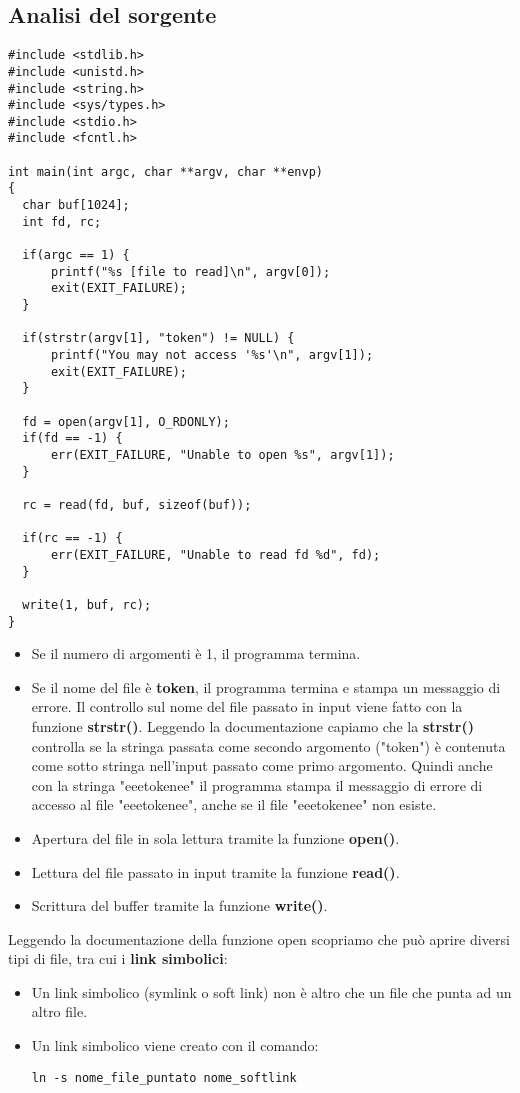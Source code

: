 \subsection{Analisi del sorgente}
\begin{lstlisting}[style=cstyle]
#include <stdlib.h>
#include <unistd.h>
#include <string.h>
#include <sys/types.h>
#include <stdio.h>
#include <fcntl.h>

int main(int argc, char **argv, char **envp)
{
  char buf[1024];
  int fd, rc;

  if(argc == 1) {
      printf("%s [file to read]\n", argv[0]);
      exit(EXIT_FAILURE);
  }

  if(strstr(argv[1], "token") != NULL) {
      printf("You may not access '%s'\n", argv[1]);
      exit(EXIT_FAILURE);
  }

  fd = open(argv[1], O_RDONLY);
  if(fd == -1) {
      err(EXIT_FAILURE, "Unable to open %s", argv[1]);
  }

  rc = read(fd, buf, sizeof(buf));
  
  if(rc == -1) {
      err(EXIT_FAILURE, "Unable to read fd %d", fd);
  }

  write(1, buf, rc);
}
\end{lstlisting}
\begin{itemize}
    \item Se il numero di argomenti è 1, il programma termina.
    \item Se il nome del file è \textbf{token}, il programma termina e stampa un messaggio di errore.
    Il controllo sul nome del file passato in input viene fatto con la funzione \textbf{strstr()}. Leggendo la documentazione capiamo che la \textbf{strstr()} controlla se la stringa passata come secondo argomento ("token") è contenuta come sotto stringa nell’input passato come primo argomento. Quindi anche con la stringa "eeetokenee" il programma stampa il messaggio di errore di accesso al file "eeetokenee", anche se il file "eeetokenee" non esiste.
    \item Apertura del file in sola lettura tramite la funzione \textbf{open()}.
    \item Lettura del file passato in input tramite la funzione \textbf{read()}.
    \item Scrittura del buffer tramite la funzione \textbf{write()}.
\end{itemize}
Leggendo la documentazione della funzione open scopriamo che può aprire diversi tipi di file, tra cui i \textbf{link simbolici}:
\begin{itemize}
    \item Un link simbolico (symlink o soft link) non è altro che un file che punta ad un altro file.
    \item Un link simbolico viene creato con il comando:
    \begin{lstlisting}[style=bashstyle]
    ln -s nome_file_puntato nome_softlink
    \end{lstlisting}
\end{itemize}

